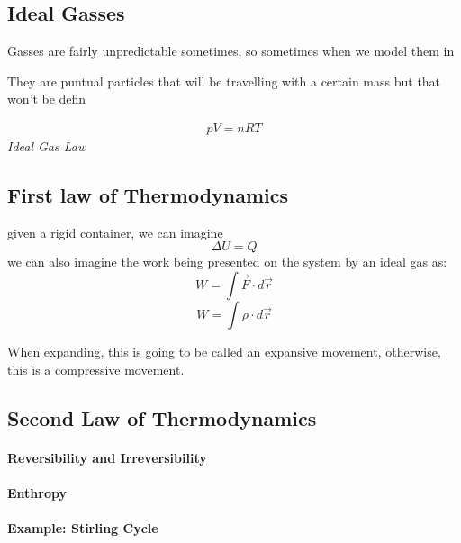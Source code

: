 \documentclass[11pt,fleqn]{book} %
\begin{document}
\section{Ideal Gasses}

Gasses are fairly unpredictable sometimes, so sometimes when we model them in 

They are puntual particles that will be travelling with a certain mass but that won't be defin

\begin{center}
    \begin{gather}
        pV = nRT
    \end{gather}
    \textit{Ideal Gas Law}
\end{center}

\section{First law of Thermodynamics}

given a rigid container, we can imagine
$$\Delta U = Q$$
we can also imagine the work being presented on the system by an ideal gas as:
$$W = \int \vec{F} \cdot d\vec{r}$$
$$W = \int \rho \cdot d\vec{r}$$

When expanding, this is going to be called an expansive movement, otherwise, this is a 
compressive movement. 

\section{Second Law of Thermodynamics}

\subsubsection{Reversibility and Irreversibility}

\subsubsection{Enthropy}



\subsubsection{Example: Stirling Cycle}



\chapter{}


\printbibliography
\end{document}
